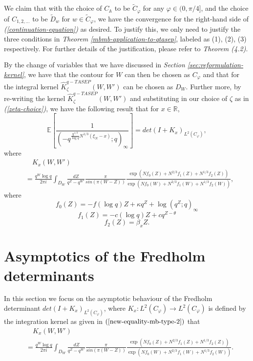 We claim that with the choice of $C_{\mathbb{A}}$ to be $\tilde{C}_{\varphi}$ for any $\varphi \in (0, \pi / 4]$, and the choice of $C_{1, 2, \dots}$ to be $\tilde{D}_{w}$ for $w \in \tilde{C}_{\varphi}$, we have the convergence for the right-hand side of \textit{(\ref{continuation-equation})} as desired. To justify this, we only need to justify the three conditions in \textit{Theorem \ref{mbmb-application-to-qtasep}}, labeled as (1), (2), (3) respectively. For further details of the justification, please refer to \textit{\cite{asymptotics2013} Theorem (4.2)}.

By the change of variables that we have discussed in \textit{Section \ref{sec:reformulation-kernel}}, we have that the contour for $W$ can then be chosen as $C_{\varphi}$ and that for the integral kernel $\hat{K}_{\zeta}^{q-TASEP}(W,W')$ can be chosen as $D_W$. Further more, by re-writing the kernel $\hat{K}_{\zeta}^{q-TASEP}(W,W')$ and substituting in our choice of $\zeta$ as in \textit{(\ref{zeta-choice})}, we have the following result that for $x \in \mathbb{R}$, 
\begin{equation}
\label{new-equality-mb-type-2}
\mathbb{E} \left[ \frac{1}{( -q^{ \frac{\chi^{1/3}}{\log q} N^{1/3} (\xi_N - x) }; q )_{\infty}} \right] = det(I+K_x)_{L^2(C_{\varphi})},
\end{equation}
where 
\begin{align*}
& \quad K_x(W,W') \\
& = \frac{q^W \log q}{2 \pi i} \int_{D_W} \frac{dZ}{q^Z - q^{W'}} \frac{\pi}{sin(\pi (W-Z))} \frac{\exp(Nf_0(Z) + N^{2/3} f_1(Z) + N^{1/3} f_2(Z))}{\exp(Nf_0(W) + N^{2/3} f_1(W) + N^{1/3} f_2(W))},
\end{align*}
where
\begin{equation*}
f_0(Z) = -f (\log q) Z + \kappa q^Z + \log(q^Z; q)_{\infty}
\end{equation*}
\begin{equation*}
f_1(Z) = -c (\log q) Z + cq^{Z - \theta}
\end{equation*}
\begin{equation*}
f_2(Z) = \beta_x Z.
\end{equation*}

\section{Asymptotics of the Fredholm determinants}
In this section we focus on the asymptotic behaviour of the Fredholm determinant $det(I+K_x)_{L^2(C_{\varphi})}$, where $K_x: L^2(C_{\varphi}) \rightarrow L^2(C_{\varphi})$ is defined by the integration kernel as given in $(\ref{new-equality-mb-type-2})$ that
\begin{align*}
& \quad K_x(W,W') \\
& = \frac{q^W \log q}{2 \pi i} \int_{D_W} \frac{dZ}{q^Z - q^{W'}} \frac{\pi}{sin(\pi (W-Z))} \frac{\exp(Nf_0(Z) + N^{2/3} f_1(Z) + N^{1/3} f_2(Z))}{\exp(Nf_0(W) + N^{2/3} f_1(W) + N^{1/3} f_2(W))}.
\end{align*}

